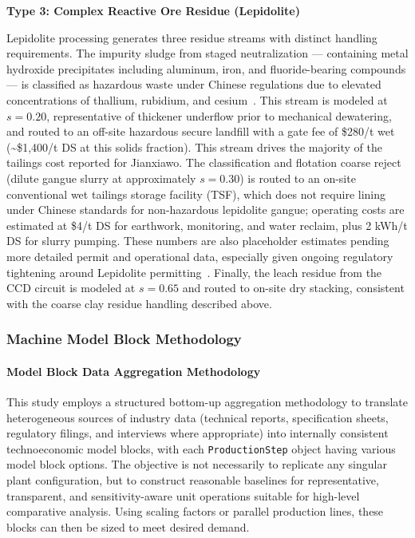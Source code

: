\medskip
\noindent\textbf{Type 3: Complex Reactive Ore Residue (Lepidolite)}\quad

Lepidolite processing generates three residue streams with distinct handling requirements. The impurity sludge from staged neutralization --- containing metal hydroxide precipitates including aluminum, iron, and fluoride-bearing compounds --- is classified as hazardous waste under Chinese regulations due to elevated concentrations of thallium, rubidium, and cesium~\cite{sulcaLithiumPricesWhere2024, fisherScrutinisingLithiumTechnology2022}. This stream is modeled at $s=0.20$, representative of thickener underflow prior to mechanical dewatering, and routed to an off-site hazardous secure landfill with a gate fee of \$280/t wet (\textasciitilde\$1,400/t DS at this solids fraction). This stream drives the majority of the tailings cost reported for Jianxiawo. 
The classification and flotation coarse reject (dilute gangue slurry at approximately $s=0.30$) is routed to an on-site conventional wet tailings storage facility (TSF), which does not require lining under Chinese standards for non-hazardous lepidolite gangue; operating costs are estimated at \$4/t DS for earthwork, monitoring, and water reclaim, plus 2 kWh/t DS for slurry pumping. These numbers are also placeholder estimates pending more detailed permit and operational data, especially given ongoing regulatory tightening around Lepidolite permitting~\cite{benchmarkteamCATLSuspendsOperations, zhangChinaHasDomestic2025}. Finally, the leach residue from the CCD circuit is modeled at $s=0.65$ and routed to on-site dry stacking, consistent with the coarse clay residue handling described above.

\clearpage
\subsubsection{Machine Model Block Methodology}\label{app:04-methods-machineblocks}

\paragraph{Model Block Data Aggregation Methodology}\label{app:04-methods-machineblocks-aggregation}

This study employs a structured bottom-up aggregation methodology to translate heterogeneous sources of industry data (technical reports, specification sheets, regulatory filings, and interviews where appropriate) into internally consistent technoeconomic model blocks, with each \texttt{ProductionStep} object having various model block options. The objective is not necessarily to replicate any singular plant configuration, but to construct reasonable baselines for representative, transparent, and sensitivity-aware unit operations suitable for high-level comparative analysis. Using scaling factors or parallel production lines, these  blocks can then be sized to meet desired demand.

